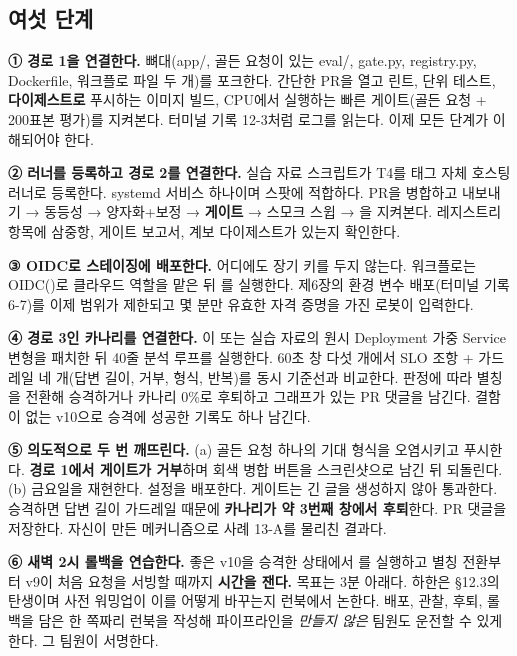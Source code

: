 \subsection*{여섯 단계}

\begin{tbbitemize}
  \item \textbf{① 경로 1을 연결한다.} 뼈대(app/, 골든 요청이 있는 eval/, gate.py, registry.py, Dockerfile, 워크플로 파일 두 개)를 포크한다. 간단한 PR을 열고 린트, 단위 테스트, \textbf{다이제스트로} 푸시하는 이미지 빌드, CPU에서 실행하는 빠른 게이트(골든 요청 + 200표본 평가)를 지켜본다. 터미널 기록 12-3처럼 로그를 읽는다. 이제 모든 단계가 이해되어야 한다.
  \item \textbf{② 러너를 등록하고 경로 2를 연결한다.} 실습 자료 스크립트가 T4를  태그 자체 호스팅 러너로 등록한다. systemd 서비스 하나이며 스팟에 적합하다. PR을 병합하고 내보내기 → 동등성 → 양자화+보정 → \textbf{게이트} → 스모크 스윕 → 을 지켜본다. 레지스트리 항목에 삼중항, 게이트 보고서, 계보 다이제스트가 있는지 확인한다.
  \item \textbf{③ OIDC로 스테이징에 배포한다.} 어디에도 장기 키를 두지 않는다. 워크플로는 OIDC()로 클라우드 역할을 맡은 뒤 를 실행한다. 제6장의 환경 변수 배포(터미널 기록 6-7)를 이제 범위가 제한되고 몇 분만 유효한 자격 증명을 가진 로봇이 입력한다.
  \item \textbf{④ 경로 3인 카나리를 연결한다.} 이  또는 실습 자료의 원시 Deployment 가중 Service 변형을 패치한 뒤 40줄 분석 루프를 실행한다. 60초 창 다섯 개에서 SLO 조항 + 가드레일 네 개(답변 길이, 거부, 형식, 반복)를 동시 기준선과 비교한다. 판정에 따라 별칭을 전환해 승격하거나 카나리 0\%로 후퇴하고 그래프가 있는 PR 댓글을 남긴다. 결함이 없는 v10으로 승격에 성공한 기록도 하나 남긴다.
  \item \textbf{⑤ 의도적으로 두 번 깨뜨린다.} (a) 골든 요청 하나의 기대 형식을 오염시키고 푸시한다. \textbf{경로 1에서 게이트가 거부}하며 회색 병합 버튼을 스크린샷으로 남긴 뒤 되돌린다. (b) 금요일을 재현한다.  설정을 배포한다. 게이트는 긴 글을 생성하지 않아 통과한다. 승격하면 답변 길이 가드레일 때문에 \textbf{카나리가 약 3번째 창에서 후퇴}한다. PR 댓글을 저장한다. 자신이 만든 메커니즘으로 사례 13-A를 물리친 결과다.
  \item \textbf{⑥ 새벽 2시 롤백을 연습한다.} 좋은 v10을 승격한 상태에서 를 실행하고 별칭 전환부터 v9이 처음 요청을 서빙할 때까지 \textbf{시간을 잰다.} 목표는 3분 아래다. 하한은 §12.3의 탄생이며 사전 워밍업이 이를 어떻게 바꾸는지 런북에서 논한다. 배포, 관찰, 후퇴, 롤백을 담은 한 쪽짜리 런북을 작성해 파이프라인을 \textit{만들지 않은} 팀원도 운전할 수 있게 한다. 그 팀원이 서명한다.
\end{tbbitemize}

